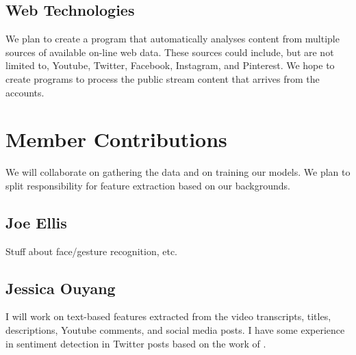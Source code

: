 \documentclass[paper=a4, fontsize=11pt]{scrartcl} %
\begin{document}
\subsection{Web Technologies}
We plan to create a program that automatically analyses content from multiple sources of available on-line web data.
These sources could include, but are not limited to, Youtube, Twitter, Facebook, Instagram, and Pinterest.
We hope to create programs to process the public stream content that arrives from the accounts.

\section{Member Contributions}

We will collaborate on gathering the data and on training our models.  We plan to split responsibility for feature extraction based on our backgrounds.

\subsection{Joe Ellis}
{\color{red} Stuff about face/gesture recognition, etc.}

\subsection{Jessica Ouyang}
I will work on text-based features extracted from the video transcripts, titles, descriptions, Youtube comments, and social media posts.  
I have some experience in sentiment detection in Twitter posts based on the work of \cite{agarwal2009contextual}.  






\end{document}
